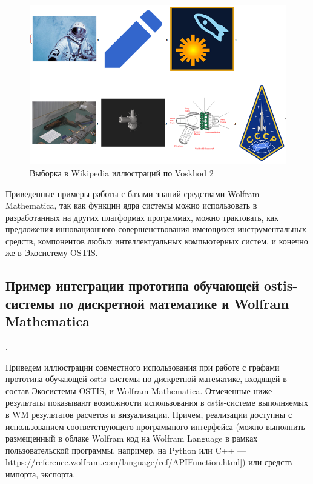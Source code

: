 \begin{figure}[H]
	\centering
	\includegraphics[scale=0.56]{images/part7/chapter_integration/integr_alg7.png}
	\caption{Выборка в Wikipedia иллюстраций по Voskhod 2}
	\label{fig:integr_alg7}
\end{figure}

Приведенные примеры работы с базами знаний средствами Wolfram Mathematica, так как функции ядра системы можно использовать в разработанных на других платформах программах, можно трактовать, как предложения инновационного совершенствования имеющихся инструментальных средств, компонентов любых интеллектуальных компьютерных систем, и конечно же в Экосистему OSTIS. 

\subsection{Пример интеграции прототипа обучающей ostis-системы по дискретной математике и Wolfram Mathematica}.
\label{subsec_cas_intergation}

Приведем иллюстрации совместного использования при работе с графами прототипа обучающей ostis-системы по дискретной математике, входящей в состав Экосистемы OSTIS, и Wolfram Mathematica. Отмеченные ниже результаты показывают возможности использования в ostis-системе выполняемых в WM результатов расчетов и визуализации. Причем, реализации доступны с использованием соответствующего программного интерфейса (можно выполнить размещенный в облаке Wolfram код на Wolfram Language в рамках пользовательской программы, например, на Python или C++ --- https://reference.wolfram.com/language/ref/APIFunction.html]) или средств импорта, экспорта. 

